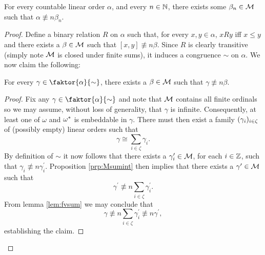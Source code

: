 \begin{thm}\label{thm:LLlin} For every countable linear
	order $\alpha$, and every $n\in\mathbb{N}$, there exists some $\beta_n\in\mathcal{M}$ such
	that $\alpha\nequiv{n}\beta_n$.
\end{thm}
\begin{proof} Define a binary relation $R$ on $\alpha$ such that, for every
	$x,y\in\alpha$, $xRy$ iff $x\leq y$ and there exists a $\beta\in\mathcal{M}$ such that
	$[x,y]\nequiv{n}\beta$.  Since $R$ is clearly transitive (simply note $\mathcal{M}$ is
	closed under finite sums), it induces a congruence $\sim$ on $\alpha$.    We now
	claim the following:
	\begin{claim} For every $\gamma\in\faktor{\alpha}{\sim}$, there exists a
		$\beta\in\mathcal{M}$ such that $\gamma\nequiv{n}\beta$.
	\end{claim}
	\begin{proof} Fix any $\gamma\in\faktor{\alpha}{\sim}$ and note that $\mathcal{M}$
		contains all finite ordinals so we may assume, without loss of generality, that
		$\gamma$ is infinite.  Consequently, at least one of $\omega$ and
		${\omega}^\ast$ is embeddable in $\gamma$.  There must then exist a family
		$(\gamma_i)_{i\in\zeta}$ of (possibly empty) linear orders such that
		\begin{equation} \gamma\cong\sum_{i\in\zeta}\gamma_i.
		\end{equation} By definition of $\sim$ it now follows that there exists
		a $\gamma_i^\prime\in\mathcal{M}$, for each $i\in\mathbb{Z}$, such that
		$\gamma_i\nequiv{n}\gamma_i^\prime$.  Proposition \ref{prp:Msumint} then implies
		that there exists a $\gamma^\prime\in\mathcal{M}$ such that
		\begin{equation} \gamma^\prime\nequiv{n}\sum_{i\in\zeta}\gamma_i^\prime.
		\end{equation} From lemma \ref{lem:fvsum} we may conclude that
		\begin{equation} \gamma\nequiv{n}\sum_{i\in\zeta}\gamma_i^\prime\nequiv{n}\gamma^\prime,
		\end{equation} establishing the claim.
	\end{proof}


\end{proof}
